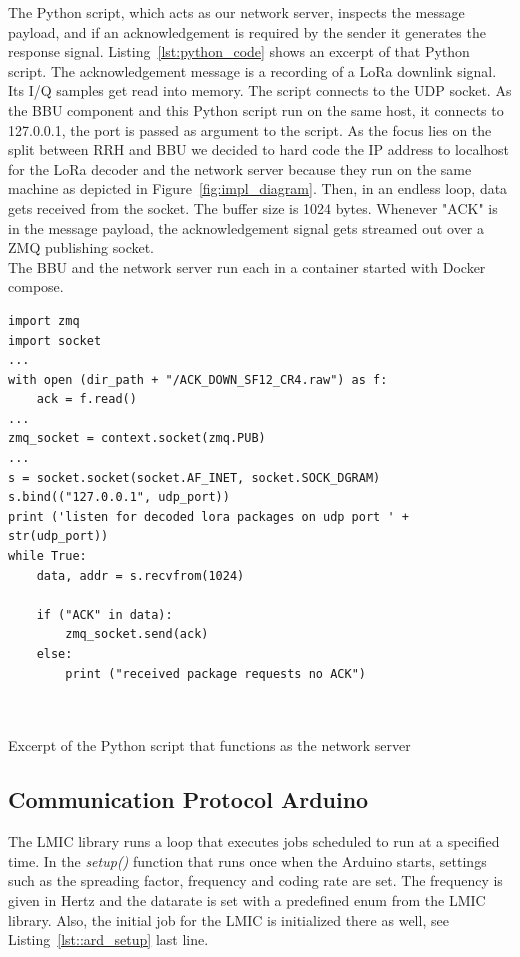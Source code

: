 The Python script, which acts as our network server, inspects the message payload, and if an 
acknowledgement is required by the sender it generates the response signal. 
Listing~\ref{lst:python_code} shows an excerpt of that Python script.
The acknowledgement message is a recording of a LoRa downlink signal. Its I/Q samples get read into memory.
The script connects to the UDP socket. As the BBU component and this Python script run on the same host, it connects
to 127.0.0.1, the port is passed as argument to the script. As the focus lies on the split between RRH and BBU we decided
to hard code the IP address to localhost for the LoRa decoder and the network server because they run on the same machine as depicted 
in Figure~\ref{fig:impl_diagram}. 
Then, in an endless loop, data gets received from the socket. The buffer size is 1024 bytes.
Whenever "ACK" is in the message payload, the acknowledgement signal gets streamed out over a ZMQ publishing socket.
\\
The BBU and the network server run each in a container started with Docker compose.


\begin{listing}[h]
\begin{verbatim}
import zmq
import socket
...
with open (dir_path + "/ACK_DOWN_SF12_CR4.raw") as f:
    ack = f.read()
...
zmq_socket = context.socket(zmq.PUB)
...
s = socket.socket(socket.AF_INET, socket.SOCK_DGRAM)
s.bind(("127.0.0.1", udp_port))
print ('listen for decoded lora packages on udp port ' + str(udp_port))
while True:
    data, addr = s.recvfrom(1024)

    if ("ACK" in data):
        zmq_socket.send(ack) 
    else:
        print ("received package requests no ACK")
     
    
    \end{verbatim}
    \caption{Excerpt of the Python script that functions as the network server}
    \label{lst:python_code}
\end{listing}

\subsection{Communication Protocol Arduino}
\label{sec:comm_prot}

The LMIC library runs a loop that executes jobs scheduled to run at a specified time. 
In the \emph{setup()} function that runs once when the Arduino starts, settings such as 
the spreading factor, frequency and coding rate are set. The frequency is given in Hertz and the datarate 
is set with a predefined enum from the LMIC library. Also, the initial job for the LMIC is initialized there as well, see 
Listing~\ref{lst::ard_setup} last line.

